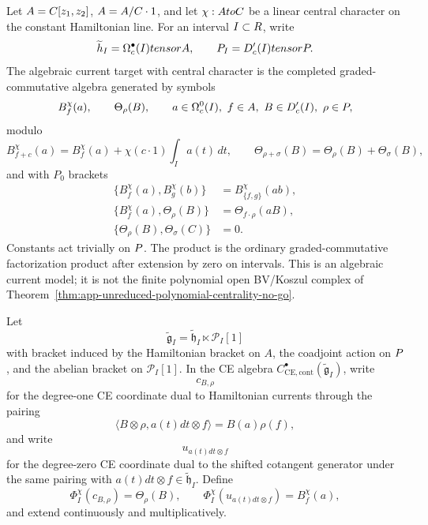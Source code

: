 \begin{defn}
\label{def:app-central-character-principal-part-current-algebra}
  Let \(A=C[z_1,z_2]\), \(A=A/C\cdot1\), and let
  \(\chi: AtoC\) be a linear central character on the constant
  Hamiltonian line.  For an interval \(I\subset R\), write
  \[
    \widetilde{h}_I=\Omega^\bullet_c(I)tensor A,
    \qquad
    P_I=D'_c(I)tensorP .
  \]
  The algebraic current target with central character is the completed
  graded-commutative algebra generated by symbols
  \[
    B_f^\chi(a),\qquad \Theta_\rho(B),
    \qquad
    a\in\Omega^0_c(I),\ f\in A,\ B\in D'_c(I),\
    \rho\in P,
  \]
  modulo
  \[
    B_{f+c}^\chi(a)=B_f^\chi(a)+\chi(c\cdot1)\int_Ia(t)\,dt,\qquad
    \Theta_{\rho+\sigma}(B)=\Theta_\rho(B)+\Theta_\sigma(B),
  \]
  and with \(P_0\) brackets
  \[
  \begin{aligned}
    \{B_f^\chi(a),B_g^\chi(b)\}
      &=B_{\{f,g\}}^\chi(ab),\\
    \{B_f^\chi(a),\Theta_\rho(B)\}
      &=\Theta_{f\cdot\rho}(aB),\\
    \{\Theta_\rho(B),\Theta_\sigma(C)\}&=0 .
  \end{aligned}
  \]
  Constants act trivially on \(P\).  The product is the ordinary
  graded-commutative factorization product after extension by zero on
  intervals.  This is an algebraic current model; it is not the
  finite polynomial open BV/Koszul complex of
  Theorem~\ref{thm:app-unreduced-polynomial-centrality-no-go}.
\end{defn}

\begin{constr}
\label{constr:app-algebraic-factorization-centre-lift}
  Let
  \[
    \widetilde{\mathfrak g}_I
      =\widetilde{\mathfrak h}_I\ltimes\mathcal P_I[1]
  \]
  with bracket induced by the Hamiltonian bracket on \(A\), the
  coadjoint action on \(P\), and the abelian bracket on
  \(\mathcal P_I[1]\).  In the CE algebra
  \(C^\bullet_{\mathrm{CE},\mathrm{cont}}(\widetilde{\mathfrak g}_I)\),
  write
  \[
    c_{B,\rho}
  \]
  for the degree-one CE coordinate dual to Hamiltonian currents through
  the pairing
  \[
    \langle B\otimes\rho,a(t)dt\otimes f\rangle
      =B(a)\rho(f),
  \]
  and write
  \[
    u_{a(t)dt\otimes f}
  \]
  for the degree-zero CE coordinate dual to the shifted cotangent
  generator under the same pairing with
  \(a(t)dt\otimes f\in\widetilde{\mathfrak h}_I\).
  Define
  \[
    \Phi_I^\chi(c_{B,\rho})=\Theta_\rho(B),\qquad
    \Phi_I^\chi(u_{a(t)dt\otimes f})=B_f^\chi(a),
  \]
  and extend continuously and multiplicatively.
\end{constr}

